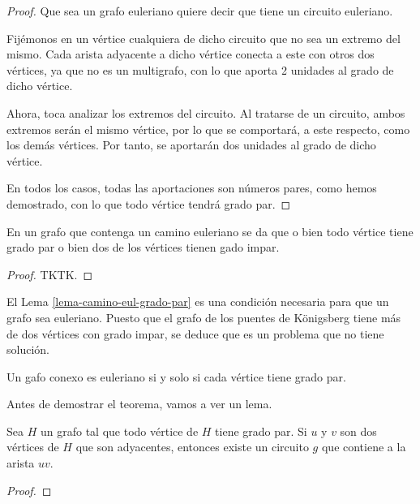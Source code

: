 \begin{proof}
  Que sea un grafo euleriano quiere decir que tiene un circuito euleriano.

  Fijémonos en un vértice cualquiera de dicho circuito que no sea un extremo
  del mismo. Cada arista adyacente a dicho vértice conecta a este con otros
  dos vértices, ya que no es un multigrafo, con lo que aporta 2 unidades al
  grado de dicho vértice.

  Ahora, toca analizar los extremos del circuito. Al tratarse de un
  circuito, ambos extremos serán el mismo vértice, por lo que se comportará,
  a este respecto, como los demás vértices. Por tanto, se aportarán dos
  unidades al grado de dicho vértice.

  En todos los casos, todas las aportaciones son números pares, como hemos
  demostrado, con lo que todo vértice tendrá grado par.
\end{proof}

\begin{lemma}\label{lema-camino-eul-grado-par}
  En un grafo que contenga un camino euleriano se da que o bien todo vértice
  tiene grado par o bien dos de los vértices tienen gado impar.

\end{lemma}

\begin{proof}
  TKTK.
\end{proof}

El Lema \ref{lema-camino-eul-grado-par} es una condición necesaria para que
un grafo sea euleriano. Puesto que el grafo de los puentes de Königsberg
tiene más de dos vértices con grado impar, se deduce que es un problema que
no tiene solución.

\begin{theorem}
  Un gafo conexo es euleriano si y solo si cada vértice tiene grado par.
\end{theorem}

Antes de demostrar el teorema, vamos a ver un lema.

\begin{lemma}
  Sea $H$ un grafo tal que todo vértice de $H$ tiene grado par. Si $u$ y $v$
  son dos vértices de $H$ que son adyacentes, entonces existe un circuito
  $g$ que contiene a la arista $uv$.
\end{lemma}

\begin{proof}
  





\end{proof}


















